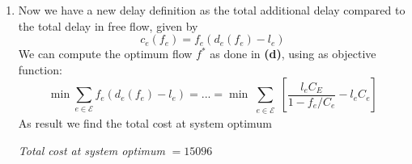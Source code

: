\documentclass[
	12pt, %
]{fphw}
\begin{document}
\begin{enumerate}[{\bfseries (a)}]
\begin{enumerate}[1.]
    \item One way to influence the self determination of users captured by the Wardrop equilibrium is to add tolls $w_e > 0$ intended as a price users have to pay to travel a specific link, in this way the cost/delay perceived by users become: 
    $$ w_e + d_e(f_e) $$
    
    We define the tolls as $w_e = f^*_ed'_e(f^*_e )$ again we can use the same strategy as in \textbf{(e.1)} to find the flow at Wardrop equilibrium. \\
    
    We replace the objective function with: 
        $$
            \min \sum_{\substack{e \in \mathcal{E}}}\left(\int_0^{f_e}d_e(s)ds + f_ew_e\right) =
            ... = \min \sum_{\substack{e \in \mathcal{E}}}\left[-l_eC_e\log\left(1-\frac{f_e}{C_e}\right)+\frac{l_eC_e}{(C_e-f_e^*)^2}f_e\right]
        $$
    
    Result obtained are: 
    \begin{multline*}
        f^{(w)} = [ 6642,  6059,  3132,  3132, 10163,  4638,  3006,  2542,  3131,   583,     0,  2926,     0,  3132,  5524,  2854,  4886,  2215,   463,  2337,  3318,  5655,  2373,     0,  6414,  5505,  4886,  4886]
    \end{multline*}
        
        And the total travel time at Wardrop equilibrium with tolls is:
    \begin{center}
        \emph{Total travel time at Wardrop equilibrium with tolls} $= 25944$
    \end{center}
    
    The interesting fact here is that the t.t.t. (total travel time) with tolls is the same as t.t.t at system optimum.
    \end{enumerate}
    
    \item Now we have a new delay definition as the total additional delay compared to the total delay in free flow, given by
    $$
	    c_e(f_e) = f_e(d_e(f_e) - l_e)
	$$
	We can compute the optimum flow $f^*$ as done in \textbf{(d)}, using as objective function:
	$$
        \min \sum_{e \in \mathcal{E}}f_e \left( d_e(f_e) - l_e \right)=
            ... = \min \sum_{\substack{e \in \mathcal{E}}}\left[\frac{l_eC_E}{1-f_e/C_e}-l_eC_e\right]
    $$
    As result we find the total cost at system optimum
    \begin{center}
        \emph{Total cost at system optimum} $= 15096$
    \end{center}
    

\end{enumerate}
\end{document}
